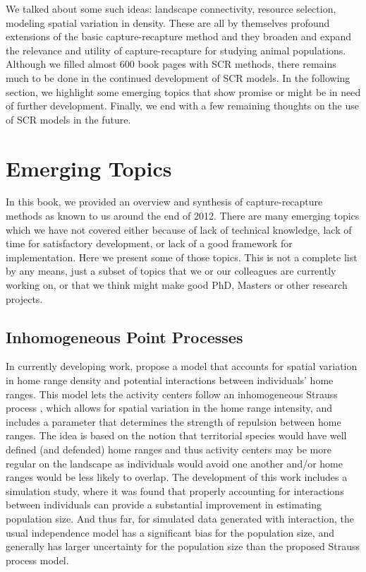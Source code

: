 We talked about some such ideas: landscape connectivity, resource
selection, modeling spatial variation in density. These are all by
themselves profound extensions of the basic capture-recapture method
and they broaden and expand the relevance and utility of
capture-recapture for studying animal populations.
Although we filled almost 600 book pages with SCR methods,
there remains much to be done in the continued development of SCR
models. In the following section, we highlight some emerging topics that show promise or might be in
need of further development. Finally, we end with a few remaining
thoughts on the use of SCR models in the future.



\section{Emerging Topics}

In this book, we provided an overview and synthesis of
capture-recapture methods as known to us around the end of 2012. There
are many emerging topics which we have not covered either because of
lack of technical knowledge, lack of time for satisfactory
development, or lack of a good framework for implementation. Here we
present some of those topics. This is not a complete list by any means,
just a subset of topics that we or our colleagues are currently working on, or that we think
might make good PhD, Masters or other research projects.



\subsection{Inhomogeneous Point Processes}
\label{last.sec.ipp}

In currently developing work, \citet{reich_etal:2012} propose a model
that accounts for spatial variation in home range density and
potential interactions between individuals' home ranges. This model
lets the activity centers follow an inhomogeneous Strauss process
\citep{strauss:1975}, which allows for spatial variation in the home
range intensity, and includes a parameter that determines the strength
of repulsion between home ranges. The idea is based on the notion
that territorial species would have well defined (and defended) home
ranges and thus activity centers may be more regular on the landscape
as individuals would avoid one another and/or home ranges would be
less likely to overlap. The development of this work includes a
simulation study, where it was found that properly accounting for
interactions between individuals can provide a substantial improvement
in estimating population size. And thus far, for simulated data
generated with interaction, the usual independence model has a
significant bias for the population size, and generally has larger
uncertainty for the population size than the proposed Strauss process
model.

